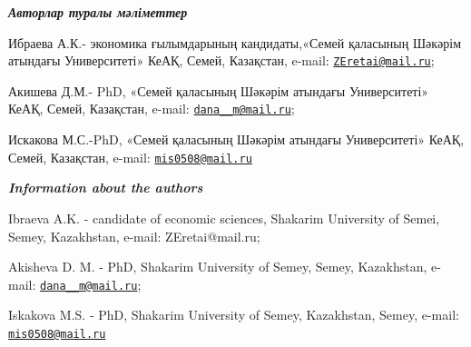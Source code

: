 \emph{{\bfseries Авторлар туралы мәліметтер}}

Ибраева А.К.- экономика ғылымдарының кандидаты,«Семей қаласының Шәкәрім
атындағы Университеті» КеАҚ, Семей, Казақстан, e-mail:
\href{mailto:ZEretai@mail.ru}{\nolinkurl{ZEretai@mail.ru}};

Акишева Д.М.- PhD, «Семей қаласының Шәкәрім атындағы Университеті» КеАҚ,
Семей, Казақстан, e-mail:
\href{mailto:dana__m@mail.ru}{\nolinkurl{dana\_\_m@mail.ru}};

Искакова М.С.-PhD, «Семей қаласының Шәкәрім атындағы Университеті» КеАҚ,
Семей, Казақстан, e-mail:
\href{mailto:mis0508@mail.ru}{\nolinkurl{mis0508@mail.ru}}

\emph{{\bfseries Information about the authors}}

Ibraeva A.K. - candidate of economic sciences, Shakarim University of
Semei, Semey, Kazakhstan, e-mail: ZEretai@mail.ru;

Akisheva D. M. - PhD, Shakarim University of Semey, Semey, Kazakhstan,
e-mail: \href{mailto:dana__m@mail.ru}{\nolinkurl{dana\_\_m@mail.ru}};

Iskakova M.S. - PhD, Shakarim University of Semey, Kazakhstan, Semey,
e-mail: \href{mailto:mis0508@mail.ru}{\nolinkurl{mis0508@mail.ru}}